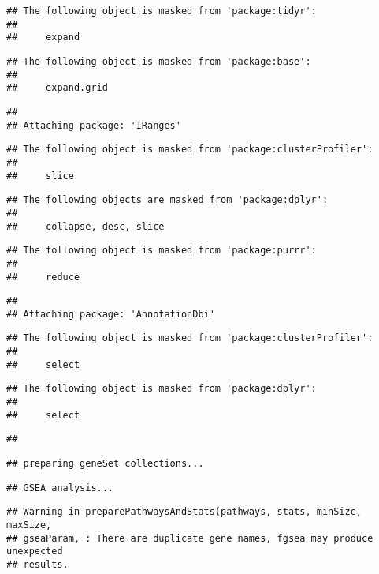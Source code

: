 \documentclass[
]{article}
\begin{document}
\begin{verbatim}
## The following object is masked from 'package:tidyr':
## 
##     expand
\end{verbatim}

\begin{verbatim}
## The following object is masked from 'package:base':
## 
##     expand.grid
\end{verbatim}

\begin{verbatim}
## 
## Attaching package: 'IRanges'
\end{verbatim}

\begin{verbatim}
## The following object is masked from 'package:clusterProfiler':
## 
##     slice
\end{verbatim}

\begin{verbatim}
## The following objects are masked from 'package:dplyr':
## 
##     collapse, desc, slice
\end{verbatim}

\begin{verbatim}
## The following object is masked from 'package:purrr':
## 
##     reduce
\end{verbatim}

\begin{verbatim}
## 
## Attaching package: 'AnnotationDbi'
\end{verbatim}

\begin{verbatim}
## The following object is masked from 'package:clusterProfiler':
## 
##     select
\end{verbatim}

\begin{verbatim}
## The following object is masked from 'package:dplyr':
## 
##     select
\end{verbatim}

\begin{verbatim}
## 
\end{verbatim}

\begin{verbatim}
## preparing geneSet collections...
\end{verbatim}

\begin{verbatim}
## GSEA analysis...
\end{verbatim}

\begin{verbatim}
## Warning in preparePathwaysAndStats(pathways, stats, minSize, maxSize,
## gseaParam, : There are duplicate gene names, fgsea may produce unexpected
## results.
\end{verbatim}
\end{document}
